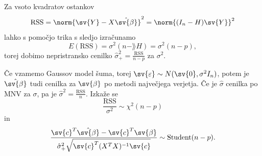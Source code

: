 
Za vsoto kvadratov ostankov
\[
  \text{RSS} = \norm{\sv{Y} - X \hat{\sv{\beta}}}^2
  = \norm{(I_n - H) \sv{Y}}^2
\]
lahko s pomočjo trika s sledjo izračunamo
\[
  E(\text{RSS}) = \sigma^2 (n - \rang H) = \sigma^2 (n-p),
\]
torej dobimo nepristransko cenilko $\hat{\sigma}^2_+ = \frac{\text{RSS}}{n-p}$
za $\sigma^2$.


Če vzamemo Gaussov model šuma, torej $\sv{\varepsilon} \sim N(\sv{0}, \sigma^2
I_n)$, potem je $\hat{\sv{\beta}}$ tudi cenilka za $\sv{\beta}$ po metodi
največjega verjetja.
Če je $\hat{\sigma}$ cenilka po MNV za $\sigma$, pa je $\hat{\sigma}^2 =
\frac{\text{RSS}}{n}$.
Izkaže se
\[
  \frac{\text{RSS}}{\sigma^2} \sim \chi^2(n-p)
\]
in
\[
  \frac{\sv{c}^T \hat{\sv{\beta}} - \sv{c}^T \sv{\beta}}{\hat{\sigma}^2_+
	\sqrt{\sv{c}^T (X^T X)^{-1} \sv{c}}}
  \sim \operatorname{Student}(n-p).
\]


